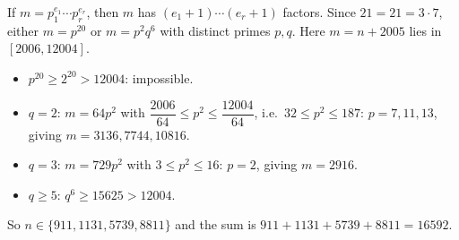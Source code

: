 If $m=p_1^{e_1}\cdots p_r^{e_r}$, then $m$ has $(e_1+1)\cdots(e_r+1)$ factors. Since $21=21=3\cdot7$, either $m=p^{20}$ or $m=p^2q^6$ with distinct primes $p,q$. Here $m=n+2005$ lies in $[2006,12004]$.
\begin{itemize}
\item $p^{20}\ge2^{20}>12004$: impossible.
\item $q=2$: $m=64p^2$ with $\dfrac{2006}{64}\le p^2\le\dfrac{12004}{64}$, i.e.\ $32\le p^2\le187$: $p=7,11,13$, giving $m=3136,7744,10816$.
\item $q=3$: $m=729p^2$ with $3\le p^2\le16$: $p=2$, giving $m=2916$.
\item $q\ge5$: $q^6\ge15625>12004$.
\end{itemize}
So $n\in\{911,1131,5739,8811\}$ and the sum is $911+1131+5739+8811=\boxed{16592}$.
